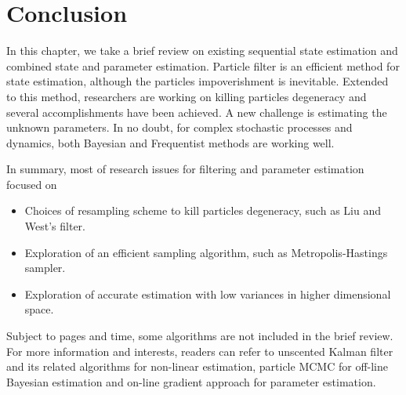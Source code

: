 \section{Conclusion}

In this chapter, we take a brief review on existing sequential state estimation and combined state and parameter estimation. Particle filter is an efficient method for state estimation, although the particles impoverishment is inevitable. Extended to this method, researchers are working on killing particles degeneracy and several accomplishments have been achieved. A new challenge is estimating the unknown parameters. In no doubt, for complex stochastic processes and dynamics, both  Bayesian and Frequentist methods are working well. 

In summary, most of research issues for filtering and parameter estimation focused on 
\begin{itemize}
\item Choices of resampling scheme to kill particles degeneracy, such as Liu and West's filter.
\item Exploration of an efficient sampling algorithm, such as Metropolis-Hastings sampler. 
\item Exploration of accurate estimation with low variances in higher dimensional space. 
\end{itemize}

Subject to pages and time, some algorithms are not included in the brief review. For more information and interests, readers can refer to unscented Kalman filter \cite{wan2000unscented} and its related algorithms for non-linear estimation, particle MCMC \cite{andrieu2010particle} for off-line Bayesian estimation and on-line gradient approach \cite{poyiadjis2005maximum} for parameter estimation. 



